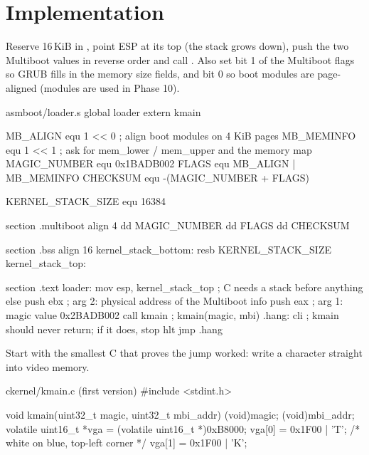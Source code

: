 \documentclass[11pt,a4paper]{article}
\begin{document}
\section{Implementation}

Reserve 16\,KiB in , point ESP at its top (the stack grows down), push the two Multiboot values in
reverse order and call . Also set bit 1 of the Multiboot flags so GRUB fills in the memory size fields,
and bit 0 so boot modules are page-aligned (modules are used in Phase 10).

\begin{lst}{asm}{boot/loader.s}
global loader
extern kmain

MB_ALIGN     equ 1 << 0                ; align boot modules on 4 KiB pages
MB_MEMINFO   equ 1 << 1                ; ask for mem_lower / mem_upper and the memory map
MAGIC_NUMBER equ 0x1BADB002
FLAGS        equ MB_ALIGN | MB_MEMINFO
CHECKSUM     equ -(MAGIC_NUMBER + FLAGS)

KERNEL_STACK_SIZE equ 16384

section .multiboot
align 4
    dd MAGIC_NUMBER
    dd FLAGS
    dd CHECKSUM

section .bss
align 16
kernel_stack_bottom:
    resb KERNEL_STACK_SIZE
kernel_stack_top:

section .text
loader:
    mov  esp, kernel_stack_top ; C needs a stack before anything else
    push ebx                   ; arg 2: physical address of the Multiboot info
    push eax                   ; arg 1: magic value 0x2BADB002
    call kmain                 ; kmain(magic, mbi)
.hang:
    cli                        ; kmain should never return; if it does, stop
    hlt
    jmp  .hang
\end{lst}

Start with the smallest C that proves the jump worked: write a character straight into video memory.

\begin{lst}{c}{kernel/kmain.c (first version)}
#include <stdint.h>

void kmain(uint32_t magic, uint32_t mbi_addr)
{
    (void)magic; (void)mbi_addr;
    volatile uint16_t *vga = (volatile uint16_t *)0xB8000;
    vga[0] = 0x1F00 | 'T';     /* white on blue, top-left corner */
    vga[1] = 0x1F00 | 'K';
}
\end{lst}
\end{document}
